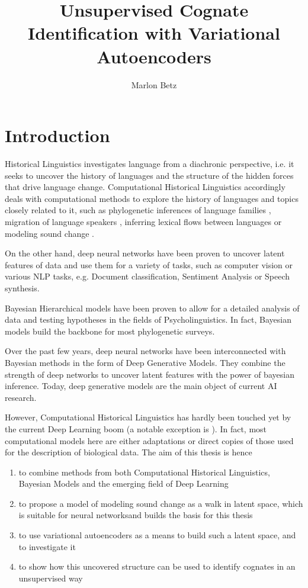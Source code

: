 \documentclass[8pt]{article}
\title{Unsupervised Cognate Identification with Variational Autoencoders}
\author{Marlon Betz}
\begin{document}
\maketitle
\newpage
\tableofcontents
\newpage

\section{Introduction}

Historical Linguistics investigates language from a diachronic perspective, i.e. it seeks to uncover the history of languages and the structure of the hidden forces that drive language change.  Computational Historical Linguistics accordingly deals with computational methods to explore the history of languages and topics closely related to it, such as phylogenetic inferences of language families \cite{bouckaert2012mapping}, migration of language speakers \cite{gray2009language}, inferring lexical flows between languages \cite{dellert2015uralic} or modeling sound change \cite{bouchard2013automated}.  

On the other hand, deep neural networks have been proven to uncover latent features of data and use them for a variety of tasks, such as computer vision or various NLP tasks, e.g. Document classification, Sentiment Analysis or Speech synthesis. 

Bayesian Hierarchical models have been proven to allow for a detailed analysis of data and testing hypotheses in the fields of Psycholinguistics. In fact, Bayesian models build the backbone for most phylogenetic surveys.

Over the past few years, deep neural networks have been interconnected with Bayesian methods in the form of Deep Generative Models. They combine the strength of deep networks to uncover latent features with the power of bayesian inference. Today, deep generative models are the main object of current AI research. 

 However, Computational Historical Linguistics has hardly been touched yet by the current Deep Learning boom (a notable exception is \cite{rama2016siamese}). 
 In fact, most computational models here are either adaptations or direct copies of those used for the description of biological data.
The aim of this thesis is hence 
\begin{enumerate}
\item to combine methods from both Computational Historical Linguistics, Bayesian Models and the emerging field of Deep Learning
\item to propose a model of modeling sound change as a walk in latent space, which is suitable for neural networksand builds the basis for this thesis
\item to use variational autoencoders as a means to build such a latent space, and to investigate it
\item to show how this uncovered structure can be used to identify cognates in an unsupervised way
\end{enumerate}
\end{document}
